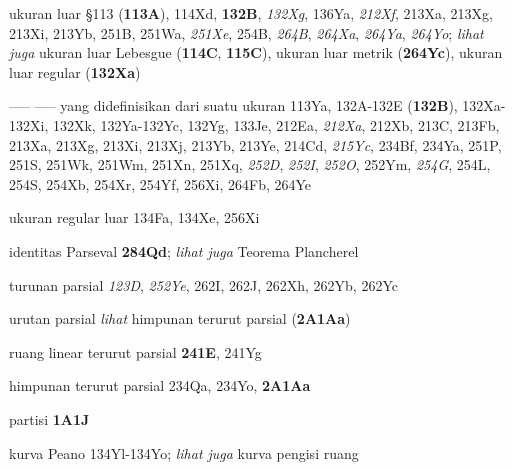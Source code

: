 ukuran luar \S113 ({\bf 113A}), 114Xd, {\bf 132B}, {\it 132Xg},
136Ya,
  {\it 212Xf}, 213Xa, 213Xg, 213Xi, 213Yb, 251B, 251Wa, {\it 251Xe},
254B, {\it 264B}, {\it 264Xa}, {\it 264Ya}, {\it 264Yo};  
  {\it lihat juga}
ukuran luar Lebesgue ({\bf 114C}, {\bf 115C}), ukuran luar metrik ({\bf 264Yc}),
  ukuran luar regular ({\bf 132Xa})

----- ----- yang didefinisikan dari suatu ukuran 113Ya,
132A-132E ({\bf 132B}), 
132Xa-132Xi, 
132Xk, 132Ya-132Yc, 
132Yg, 133Je,
  212Ea, {\it 212Xa}, 212Xb, 213C, 213Fb, 213Xa, 213Xg, 213Xi, 213Xj,
213Yb, 213Ye, 214Cd, {\it 215Yc}, 234Bf, 234Ya,
251P, 251S, 251Wk, 251Wm, 251Xn,
251Xq, {\it 252D}, {\it 252I}, {\it 252O}, 252Ym,
{\it 254G}, 254L, 254S, 254Xb, 254Xr, 254Yf, 256Xi, 264Fb, 264Ye





ukuran regular luar 134Fa, 134Xe, 256Xi









\indexmedskip













identitas Parseval {\bf 284Qd};  {\it lihat juga} Teorema Plancherel


turunan parsial {\it 123D},
  {\it 252Ye}, 262I, 262J, 262Xh, 262Yb, 262Yc 



urutan parsial
  {\it lihat} himpunan terurut parsial ({\bf 2A1Aa})




ruang linear terurut parsial {\bf 241E}, 241Yg


himpunan terurut parsial 234Qa, 234Yo, {\bf 2A1Aa}


partisi {\bf 1A1J}





kurva Peano 134Yl-134Yo;   
  {\it lihat juga} kurva pengisi ruang









